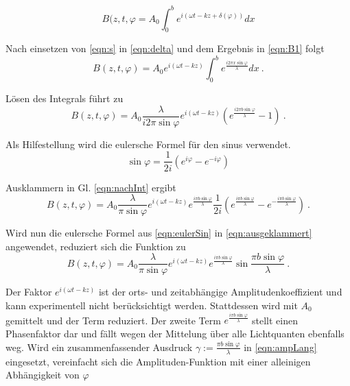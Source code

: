 \begin{equation}
  B(z, t, \varphi = A_0\int_0^be^{i(\omega t - kz + \delta(\varphi))}dx
  \label{eqn:B1}
\end{equation}

Nach einsetzen von \eqref{eqn:s} in \eqref{eqn:delta} und dem Ergebnis in \eqref{eqn:B1} folgt
\begin{equation*}
  B(z, t, \varphi) = A_0e^{i(\omega t - kz)}\int_0^be^{\frac{i2\pi x \sin{\varphi}}{\lambda}}dx \:.
\end{equation*}

Lösen des Integrals führt zu
\begin{equation}
  B(z, t, \varphi) = A_0\frac{\lambda}{i2\pi \sin{\varphi}}e^{i(\omega t - kz)}(e^{\frac{i2\pi b \sin{\varphi}}{\lambda}}-1) \:.
  \label{eqn:nachInt}
\end{equation}

Als Hilfestellung wird die eulersche Formel für den sinus verwendet.
\begin{equation}
  \sin{\varphi} = \frac{1}{2i}(e^{i\varphi}-e^{-i\varphi})
  \label{eqn:eulerSin}
\end{equation}

Ausklammern in Gl. \eqref{eqn:nachInt} ergibt
\begin{equation}
  B(z, t, \varphi) = A_0\frac{\lambda}{\pi \sin{\varphi}}e^{i(\omega t - kz)}e^{\frac{i\pi b \sin{\varphi}}{\lambda}}\frac{1}{2i}(e^{\frac{i\pi b \sin{\varphi}}{\lambda}}-e^{-\frac{i\pi b \sin{\varphi}}{\lambda}}) \:.
  \label{eqn:ausgeklammert}
\end{equation}

Wird nun die eulersche Formel aus \eqref{eqn:eulerSin} in \eqref{eqn:ausgeklammert} angewendet, reduziert sich die Funktion zu
\begin{equation}
  B(z, t, \varphi) = A_0\frac{\lambda}{\pi \sin{\varphi}}e^{i(\omega t - kz)}e^{\frac{i\pi b \sin{\varphi}}{\lambda}}\sin{\frac{\pi b \sin{\varphi}}{\lambda}} \:.
  \label{eqn:ampLang}
\end{equation}

Der Faktor $e^{i(\omega t - kz)}$ ist der orts- und zeitabhängige Amplitudenkoeffizient und kann experimentell nicht berücksichtigt werden. Stattdessen wird mit $A_0$ gemittelt
und der Term reduziert.
Der zweite Term $e^{\frac{i\pi b \sin{\varphi}}{\lambda}}$ stellt einen Phasenfaktor dar und fällt wegen der Mittelung über alle Lichtquanten ebenfalls weg.
Wird ein zusammenfassender Ausdruck $\gamma := \frac{\pi b \sin{\varphi}}{\lambda}$ in \eqref{eqn:ampLang} eingesetzt, vereinfacht sich die Amplituden-Funktion mit einer alleinigen Abhängigkeit von $\varphi$

